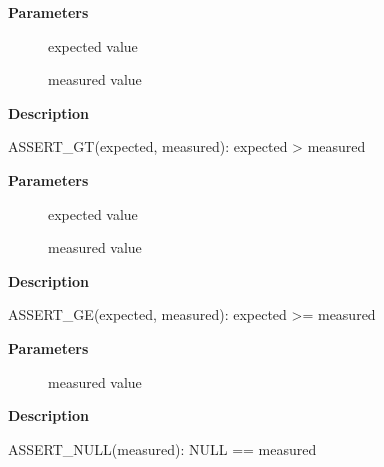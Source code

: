 \documentclass[a4paper,8pt,english]{sphinxmanual}
\begin{document}
\textbf{Parameters}
\begin{description}
\item[{}] \leavevmode
expected value

\item[{}] \leavevmode
measured value

\end{description}

\textbf{Description}

ASSERT\_GT(expected, measured): expected \textgreater{} measured

\begin{fulllineitems}
\label{dev-tools/kselftest:c.ASSERT_GE}
\end{fulllineitems}


\textbf{Parameters}
\begin{description}
\item[{}] \leavevmode
expected value

\item[{}] \leavevmode
measured value

\end{description}

\textbf{Description}

ASSERT\_GE(expected, measured): expected \textgreater{}= measured

\begin{fulllineitems}
\label{dev-tools/kselftest:c.ASSERT_NULL}
\end{fulllineitems}


\textbf{Parameters}
\begin{description}
\item[{}] \leavevmode
measured value

\end{description}

\textbf{Description}

ASSERT\_NULL(measured): NULL == measured

\begin{fulllineitems}
\label{dev-tools/kselftest:c.ASSERT_TRUE}
\end{fulllineitems}
\end{document}

